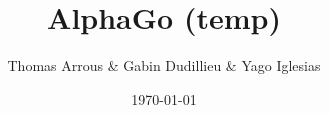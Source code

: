 \documentclass{beamer}
\begin{document}
	
	
		\title{AlphaGo (temp)}
            \author{Thomas Arrous & Gabin Dudillieu & Yago Iglesias}	
            \date{\today}
		\maketitle

		\tableofcontents
\end{document}
